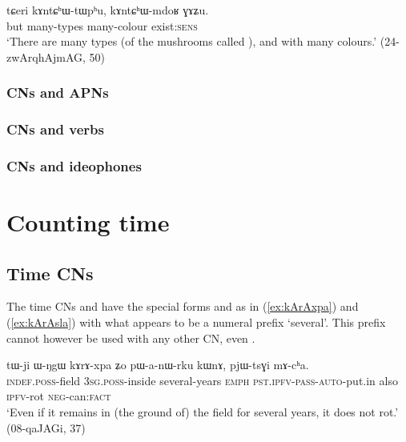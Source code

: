 {\begin{exe}
\ex \label{ex:kAntChWmdoR}
 \gll  tɕeri kɤntɕʰɯ-tɯpʰu, kɤntɕʰɯ-mdoʁ ɣɤʑu. \\
 but many-types many-colour exist:\textsc{sens} \\
\glt  `There are many types (of the mushrooms called ), and with many colours.' (24-zwArqhAjmAG, 50)
\end{exe}

\subsubsection{CNs and APNs}   \label{sec:CN.APN}
\subsubsection{CNs and verbs}   \label{sec:CN.verbs}
\subsubsection{CNs and ideophones}   \label{sec:CN.ideophones}
\section{Counting time} \label{sec:time}
\subsection{Time CNs} \label{sec:CN.time}
 
 

 

The time CNs  and  have the special forms  and  as in (\ref{ex:kArAxpa}) and (\ref{ex:kArAsla}) with what appears to be a numeral prefix  `several'. This prefix cannot however be used with any other CN, even . 

\begin{exe}
\ex \label{ex:kArAxpa}
\gll tɯ-ji ɯ-ŋgɯ kɤrɤ-xpa ʑo pɯ-a-nɯ-rku kɯnɤ, pjɯ-tsɣi mɤ-cʰa. \\
\textsc{indef}.\textsc{poss}-field \textsc{3sg}.\textsc{poss}-inside several-years \textsc{emph} \textsc{pst}.\textsc{ipfv}-\textsc{pass}-\textsc{auto}-put.in also \textsc{ipfv}-rot \textsc{neg}-can:\textsc{fact} \\
\glt `Even if it remains in (the ground of) the field for several years, it does not rot.' (08-qaJAGi, 37)
\end{exe}

}

